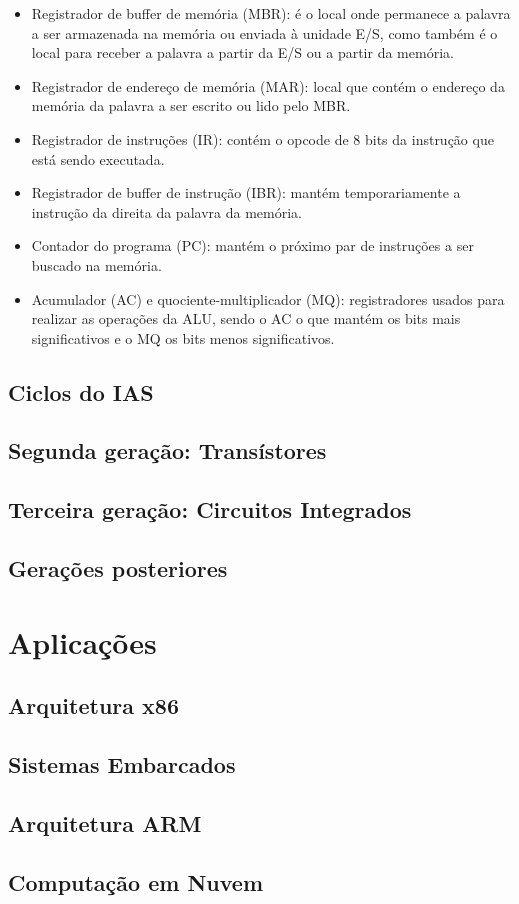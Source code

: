 \documentclass{article}
\begin{document}
\begin{itemize}
	\item Registrador de buffer de memória (MBR): é o local onde permanece a palavra a ser armazenada na memória ou enviada à unidade E/S, como também é o local para receber a palavra a partir da E/S ou a partir da memória.
	\item Registrador de endereço de memória (MAR): local que contém o endereço da memória da palavra a ser escrito ou lido pelo MBR.
	\item Registrador de instruções (IR): contém o opcode de 8 bits da instrução que está sendo executada.
	\item Registrador de buffer de instrução (IBR): mantém temporariamente a instrução da direita da palavra da memória.
	\item Contador do programa (PC): mantém o próximo par de instruções a ser buscado na memória.
	\item Acumulador (AC) e quociente-multiplicador (MQ): registradores usados para realizar as operações da ALU, sendo o AC o que mantém os bits mais significativos e o MQ os bits menos significativos.
\end{itemize}

\subsection{Ciclos do IAS}
\subsection{Segunda geração: Transístores}
\subsection{Terceira geração: Circuitos Integrados}
\subsection{Gerações posteriores}

\section{Aplicações} 
\subsection{Arquitetura x86} 
\subsection{Sistemas Embarcados}
\subsection{Arquitetura ARM} 
\subsection{Computação em Nuvem}
\end{document}
